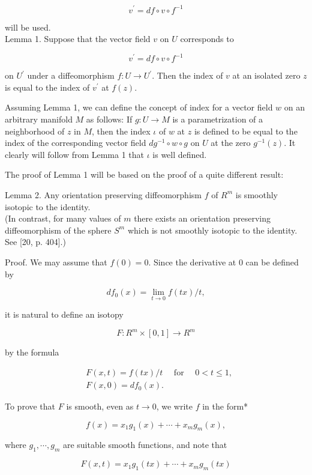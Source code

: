 \documentclass[10pt, letterpaper]{article}
\begin{document}
$$
v^{\prime}=d f \circ v \circ f^{-1}
$$

will be used.\\
Lemma 1. Suppose that the vector field $v$ on $U$ corresponds to

$$
v^{\prime}=d f \circ v \circ f^{-1}
$$

on $U^{\prime}$ under a diffeomorphism $f: U \rightarrow U^{\prime}$. Then the index of $v$ at an isolated zero $z$ is equal to the index of $v^{\prime}$ at $f(z)$.

Assuming Lemma 1, we can define the concept of index for a vector field $w$ on an arbitrary manifold $M$ as follows: If $g: U \rightarrow M$ is a parametrization of a neighborhood of $z$ in $M$, then the index $\iota$ of $w$ at $z$ is defined to be equal to the index of the corresponding vector field $d g^{-1} \circ w \circ g$ on $U$ at the zero $g^{-1}(z)$. It clearly will follow from Lemma 1 that $\iota$ is well defined.

The proof of Lemma 1 will be based on the proof of a quite different result:

Lemma 2. Any orientation preserving diffeomorphism $f$ of $R^{m}$ is smoothly isotopic to the identity.\\
(In contrast, for many values of $m$ there exists an orientation preserving diffeomorphism of the sphere $S^{m}$ which is not smoothly isotopic to the identity. See [20, p. 404].)

Proof. We may assume that $f(0)=0$. Since the derivative at 0 can be defined by

$$
d f_{0}(x)=\lim _{t \rightarrow 0} f(t x) / t,
$$

it is natural to define an isotopy

$$
F: R^{m} \times[0,1] \rightarrow R^{m}
$$

by the formula

$$
\begin{aligned}
& F(x, t)=f(t x) / t \quad \text { for } \quad 0<t \leq 1, \\
& F(x, 0)=d f_{0}(x) .
\end{aligned}
$$

To prove that $F$ is smooth, even as $t \rightarrow 0$, we write $f$ in the form*

$$
f(x)=x_{1} g_{1}(x)+\cdots+x_{m} g_{m}(x),
$$

where $g_{1}, \cdots, g_{m}$ are suitable smooth functions, and note that

$$
F(x, t)=x_{1} g_{1}(t x)+\cdots+x_{m} g_{m}(t x)
$$
\end{document}
